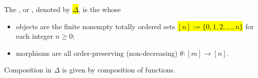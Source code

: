 \begin{definition} \label{definition:simplex_category}
The , or , denoted by \hl{$\Delta$}, is the   whose
\begin{itemize}
  \item objects are the finite nonempty totally ordered sets \hl{$[n] := \{0, 1, 2, \dots, n\}$} for each integer $n \ge 0$;
  \item morphisms are all order-preserving (non-decreasing)  $\theta : [m] \to [n]$.
\end{itemize}
Composition in $\Delta$ is given by composition of functions.
\end{definition}